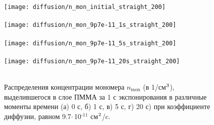 \begin{figure}[H]
	\begin{center}
		\texttt{[image: diffusion/n\_mon\_initial\_straight\_200]} \\
		\vspace{-4em}  \vspace{2.2em} \\
		\texttt{[image: diffusion/n\_mon\_9p7e-11\_1s\_straight\_200]} \\
		\vspace{-4em}  \vspace{2.2em} \\
		\texttt{[image: diffusion/n\_mon\_9p7e-11\_5s\_straight\_200]} \\
		\vspace{-4em}  \vspace{2.2em} \\
		\texttt{[image: diffusion/n\_mon\_9p7e-11\_20s\_straight\_200]} \\
		\vspace{-4em}  \vspace{2.2em} \\
	\end{center}
	\vspace{-1em}
	\caption{Распределения концентрации мономера $n_\text{mon}$ (в 1/см$^\text{3}$), выделившегося в слое ПММА за 1 с экспонирования в различные моменты времени (а) 0 с, б) 1 с, в) 5 с, г) 20 с) при коэффициенте диффузии, равном 9.7\:$\cdot$\,10$^\text{-11}$ см$^\text{2}$/c.}
	\label{fig:diffusion_initial}
\end{figure}

\newpage

